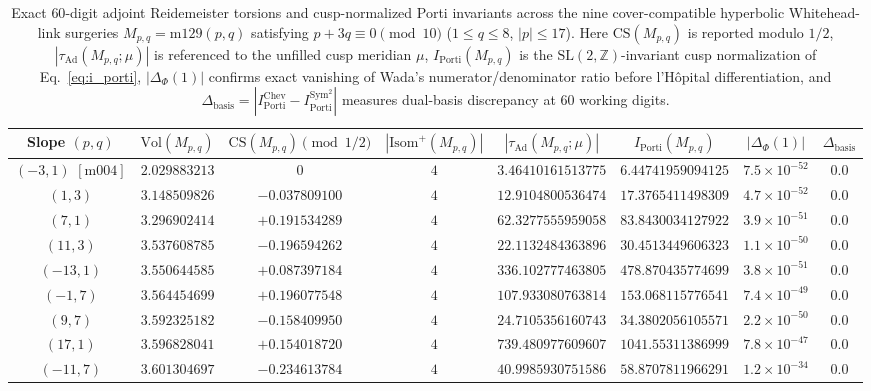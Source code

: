 \documentclass[aps,prd,twocolumn,nofootinbib,floatfix]{revtex4-2}
\begin{document}
\begin{table}[t]
\caption{Exact $60$-digit adjoint Reidemeister torsions and cusp-normalized Porti invariants across the nine cover-compatible hyperbolic Whitehead-link surgeries $M_{p,q} = \mathrm{m129}(p,q)$ satisfying $p + 3q \equiv 0 \pmod{10}$ ($1 \le q \le 8$, $|p| \le 17$). Here $\mathrm{CS}(M_{p,q})$ is reported modulo $1/2$, $|\tau_{\mathrm{Ad}}(M_{p,q};\mu)|$ is referenced to the unfilled cusp meridian $\mu$, $I_{\mathrm{Porti}}(M_{p,q})$ is the $\mathrm{SL}(2,\mathbb{Z})$-invariant cusp normalization of Eq.~\eqref{eq:i_porti}, $|\Delta_{\Phi}(1)|$ confirms exact vanishing of Wada's numerator/denominator ratio before l'H\^opital differentiation, and $\Delta_{\mathrm{basis}} = |I_{\mathrm{Porti}}^{\mathrm{Chev}} - I_{\mathrm{Porti}}^{\mathrm{Sym}^2}|$ measures dual-basis discrepancy at $60$ working digits.}
\label{tab:porti}
\begin{ruledtabular}
\begin{tabular}{cccccccc}
Slope $(p,q)$ & $\mathrm{Vol}(M_{p,q})$ & $\mathrm{CS}(M_{p,q}) \pmod{1/2}$ & $|\mathrm{Isom}^+(M_{p,q})|$ & $|\tau_{\mathrm{Ad}}(M_{p,q};\mu)|$ & $I_{\mathrm{Porti}}(M_{p,q})$ & $|\Delta_{\Phi}(1)|$ & $\Delta_{\mathrm{basis}}$ \\
\hline
$(-3, 1)$ $[\mathrm{m004}]$ & $2.029883213$ & $0$ & $4$ & $3.46410161513775$ & $6.44741959094125$ & $7.5\times 10^{-52}$ & $0.0$ \\
$(1, 3)$ & $3.148509826$ & $-0.037809100$ & $4$ & $12.9104800536474$ & $17.3765411498309$ & $4.7\times 10^{-52}$ & $0.0$ \\
$(7, 1)$ & $3.296902414$ & $+0.191534289$ & $4$ & $62.3277555959058$ & $83.8430034127922$ & $3.9\times 10^{-51}$ & $0.0$ \\
$(11, 3)$ & $3.537608785$ & $-0.196594262$ & $4$ & $22.1132484363896$ & $30.4513449606323$ & $1.1\times 10^{-50}$ & $0.0$ \\
$(-13, 1)$ & $3.550644585$ & $+0.087397184$ & $4$ & $336.102777463805$ & $478.870435774699$ & $3.8\times 10^{-51}$ & $0.0$ \\
$(-1, 7)$ & $3.564454699$ & $+0.196077548$ & $4$ & $107.933080763814$ & $153.068115776541$ & $7.4\times 10^{-49}$ & $0.0$ \\
$(9, 7)$ & $3.592325182$ & $-0.158409950$ & $4$ & $24.7105356160743$ & $34.3802056105571$ & $2.2\times 10^{-50}$ & $0.0$ \\
$(17, 1)$ & $3.596828041$ & $+0.154018720$ & $4$ & $739.480977609607$ & $1041.55311386999$ & $7.8\times 10^{-47}$ & $0.0$ \\
$(-11, 7)$ & $3.601304697$ & $-0.234613784$ & $4$ & $40.9985930751586$ & $58.8707811966291$ & $1.2\times 10^{-34}$ & $0.0$ \\
\end{tabular}
\end{ruledtabular}
\end{table}
\end{document}
